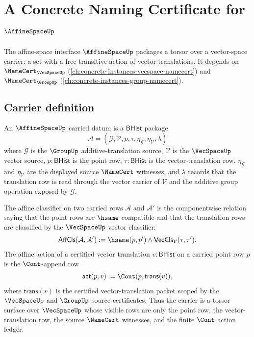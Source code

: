 \chapter{A Concrete Naming Certificate for $\AffineSpaceUp$}
\label{ch:concrete-instances-affinespace-namecert}

The affine-space interface $\AffineSpaceUp$ packages a torsor over a vector-space carrier: a set with a free transitive action of vector translations. It depends on $\NameCert_{\VecSpaceUp}$ (\autoref{ch:concrete-instances-vecspace-namecert}) and $\NameCert_{\GroupUp}$ (\autoref{ch:concrete-instances-group-namecert}).

\section{Carrier definition}
\label{sec:affinespace-carrier}

\begin{definition}
\label{def:affinespace-history-torsor-carrier}
An $\AffineSpaceUp$ carried datum is a $\mathsf{BHist}$ package
$$
\mathcal{A}=(\mathcal{G},\mathcal{V},p,\tau,\eta_{\mathcal{G}},\eta_{\mathcal{V}},\lambda)
$$
where $\mathcal{G}$ is the $\GroupUp$ additive-translation source, $\mathcal{V}$ is the $\VecSpaceUp$ vector source, $p:\mathsf{BHist}$ is the point row, $\tau:\mathsf{BHist}$ is the vector-translation row, $\eta_{\mathcal{G}}$ and $\eta_{\mathcal{V}}$ are the displayed source $\NameCert$ witnesses, and $\lambda$ records that the translation row is read through the vector carrier of $\mathcal{V}$ and the additive group operation exposed by $\mathcal{G}$.

The affine classifier on two carried rows $\mathcal{A}$ and $\mathcal{A}'$ is the componentwise relation saying that the point rows are $\hsame$-compatible and that the translation rows are classified by the $\VecSpaceUp$ vector classifier:
$$
\mathsf{AffCls}(\mathcal{A},\mathcal{A}') :=
\hsame(p,p')\land \mathsf{VecCls}_{\mathcal{V}}(\tau,\tau').
$$
The affine action of a certified vector translation $v:\mathsf{BHist}$ on a carried point row $p$ is the $\Cont$-append row
$$
\mathsf{act}(p,v):=\Cont(p,\mathsf{trans}(v)),
$$
where $\mathsf{trans}(v)$ is the certified vector-translation packet scoped by the $\VecSpaceUp$ and $\GroupUp$ source certificates. Thus the carrier is a torsor surface over $\VecSpaceUp$ whose visible rows are only the point row, the vector-translation row, the source $\NameCert$ witnesses, and the finite $\Cont$ action ledger.
\end{definition}


